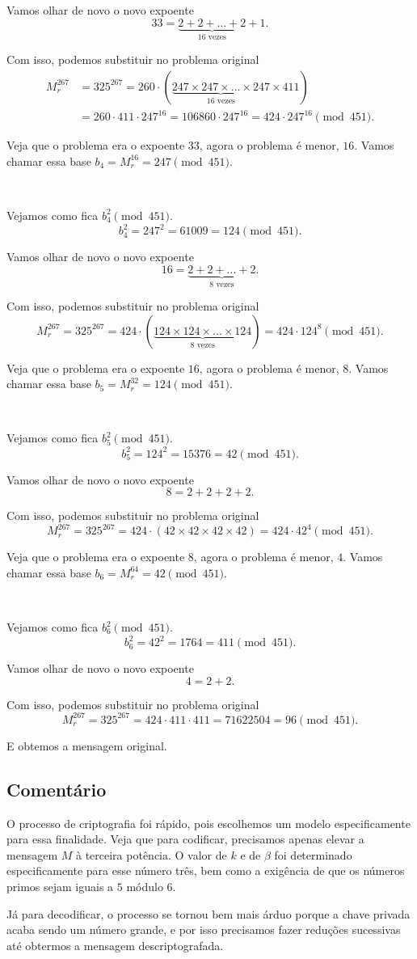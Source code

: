 \documentclass[a4paper, 12pt]{article} %
\begin{document}
Vamos olhar de novo o novo expoente
\[
33 = \underbrace{2+2+...+2}_{16 \mbox{ vezes}}+1.
\]

Com isso, podemos substituir no problema original
\[
  \begin{aligned}
M_r^{267} &= 325^{267} = 260\cdot (\underbrace{247 \times 247 \times ... \times 247}_{16 \mbox{ vezes}}\times 411) \\
& = 260\cdot 411\cdot 247^{16} = 106860\cdot 247^{16}=424\cdot 247^{16}\pmod{451}.
\end{aligned}
\]

Veja que o problema era o expoente $33$, agora o problema é menor, $16$. Vamos chamar essa base $b_4 = M_r^{16} = 247 \pmod{451}$.


\dotfill\,

Vejamos como fica $b_4^2 \pmod{451}$.
\[
b_4^2 = 247^2 = 61009 = 124 \pmod{451}.
\]

Vamos olhar de novo o novo expoente
\[
16 = \underbrace{2+2+...+2}_{8 \mbox{ vezes}}.
\]

Com isso, podemos substituir no problema original
\[
M_r^{267} = 325^{267} = 424\cdot (\underbrace{124 \times 124 \times ... \times 124}_{8 \mbox{ vezes}}) = 424\cdot 124^{8}\pmod{451}.
\]

Veja que o problema era o expoente $16$, agora o problema é menor, $8$. Vamos chamar essa base $b_5 = M_r^{32} = 124 \pmod{451}$.

\dotfill\,

Vejamos como fica $b_5^2 \pmod{451}$.
\[
b_5^2 = 124^2 = 15376 = 42 \pmod{451}.
\]

Vamos olhar de novo o novo expoente
\[
8 = 2+2+2+2.
\]

Com isso, podemos substituir no problema original
\[
M_r^{267} = 325^{267} = 424\cdot (42\times 42\times 42\times 42) = 424\cdot 42^{4}\pmod{451}.
\]

Veja que o problema era o expoente $8$, agora o problema é menor, $4$. Vamos chamar essa base $b_6 = M_r^{64} = 42 \pmod{451}$.

\dotfill\,

Vejamos como fica $b_6^2 \pmod{451}$.
\[
b_6^2 = 42^2 = 1764 = 411 \pmod{451}.
\]

Vamos olhar de novo o novo expoente
\[
4 = 2+2.
\]

Com isso, podemos substituir no problema original
\[
M_r^{267} = 325^{267} = 424\cdot 411\cdot 411 = 71622504 = 96\pmod{451}.
\]

E obtemos a mensagem original.

\subsection{Comentário}
O processo de criptografia foi rápido, pois escolhemos um modelo especificamente para essa finalidade. Veja que para codificar, precisamos apenas elevar a mensagem $M$ à terceira potência. O valor de $k$ e de $\beta$ foi determinado especificamente para esse número três, bem como a exigência de que os números primos sejam iguais a $5$ módulo $6$.

Já para decodificar, o processo se tornou bem mais árduo porque a chave privada acaba sendo um número grande, e por isso precisamos fazer reduções sucessivas até obtermos a mensagem descriptografada.
\end{document}
